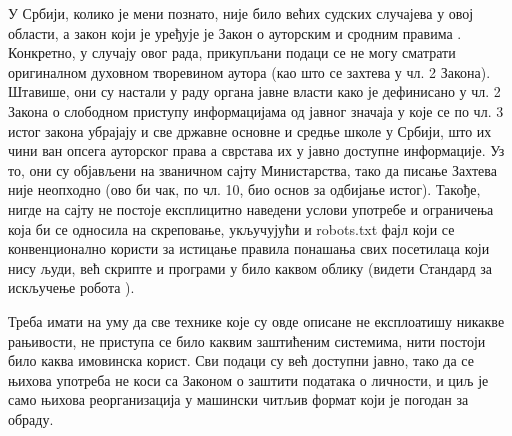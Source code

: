 У Србији, колико је мени познато, није било већих судских случајева у овој области, а закон који је уређује је Закон о ауторским и сродним правима \citep{autorskaprava}. Конкретно, у случају овог рада, прикупљани подаци се не могу сматрати оригиналном духовном творевином аутора (као што се захтева у чл. 2 Закона). Штавише, они су настали у раду органа јавне власти како је дефинисано у чл. 2 Закона о слободном приступу информацијама од јавног значаја \citep{zospi} у које се по чл. 3 истог закона убрајају и све државне основне и средње школе у Србији, што их чини ван опсега ауторског права а сврстава их у јавно доступне информације. Уз то, они су објављени на званичном сајту Министарства, тако да писање Захтева није неопходно (ово би чак, по чл. 10, био основ за одбијање истог). Такође, нигде на сајту не постоје експлицитно наведени услови употребе и ограничења која би се односила на скреповање, укључујући и robots.txt фајл који се конвенционално користи за истицање правила понашања свих посетилаца који нису људи, већ скрипте и програми у било каквом облику (видети Стандард за искључење робота \citep{robotstxt}).

Треба имати на уму да све технике које су овде описане не експлоатишу никакве рањивости, не приступа се било каквим заштићеним системима, нити постоји било каква имовинска корист. Сви подаци су већ доступни јавно, тако да се њихова употреба не коси са Законом о заштити података о личности, и циљ је само њихова реорганизација у машински читљив формат који је погодан за обраду.